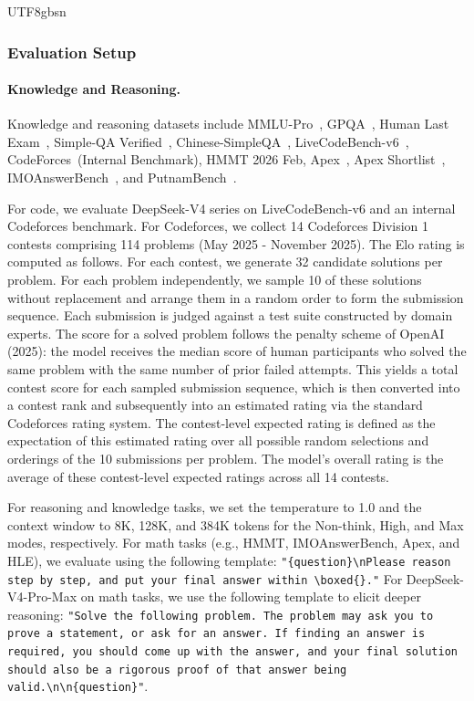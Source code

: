 \documentclass[11pt, a4paper, logo, copyright, nonumbering]{deepseek}
\newcommand{\dsviv}{DeepSeek-V4}
\newcommand{\dsvivp}{DeepSeek-V4-Pro}
\begin{document}
\begin{CJK*}{UTF8}{gbsn}
\subsubsection{Evaluation Setup}

\paragraph{Knowledge and Reasoning.} 
Knowledge and reasoning datasets include MMLU-Pro~\citep{mmlu_pro}, GPQA~\citep{gpqa}, Human Last Exam~\citep{hle}, Simple-QA Verified~\citep{haas2025simpleqa}, Chinese-SimpleQA~\citep{csimpleqa}, LiveCodeBench-v6~\citep{jain2024livecodebench}, CodeForces~(Internal Benchmark), HMMT 2026 Feb, Apex~\citep{balunovic2025matharena}, Apex Shortlist~\citep{balunovic2025matharena}, IMOAnswerBench~\citep{luong-etal-2025-towards}, and PutnamBench~\citep{tsoukalas2024putnambenchevaluatingneuraltheoremprovers}.

For code, we evaluate \dsviv{} series on LiveCodeBench-v6 and an internal Codeforces benchmark. 
For Codeforces, we collect 14 Codeforces Division 1 contests comprising 114 problems (May 2025 - November 2025). 
The Elo rating is computed as follows. 
For each contest, we generate 32 candidate solutions per problem. 
For each problem independently, we sample 10 of these solutions without replacement and arrange them in a random order to form the submission sequence. 
Each submission is judged against a test suite constructed by domain experts. 
The score for a solved problem follows the penalty scheme of OpenAI (2025): the model receives the median score of human participants who solved the same problem with the same number of prior failed attempts. 
This yields a total contest score for each sampled submission sequence, which is then converted into a contest rank and subsequently into an estimated rating via the standard Codeforces rating system. 
The contest-level expected rating is defined as the expectation of this estimated rating over all possible random selections and orderings of the 10 submissions per problem. 
The model's overall rating is the average of these contest-level expected ratings across all 14 contests.

For reasoning and knowledge tasks, we set the temperature to 1.0 and the context window to 8K, 128K, and 384K tokens for the Non-think, High, and Max modes, respectively. 
For math tasks (e.g., HMMT, IMOAnswerBench, Apex, and HLE), we evaluate using the following template: \texttt{"\{question\}\textbackslash nPlease reason step by step, and put your final answer within \textbackslash boxed\{\}."}
For \dsvivp{}-Max on math tasks, we use the following template to elicit deeper reasoning: \texttt{"Solve the following problem. The problem may ask you to prove a statement, or ask for an answer. If finding an answer is required, you should come up with the answer, and your final solution should also be a rigorous proof of that answer being valid.\textbackslash n\textbackslash n\{question\}"}.


\end{CJK*}
\end{document}
